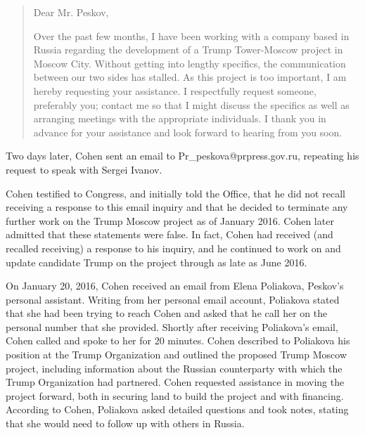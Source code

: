 \begin{quote}
Dear Mr. Peskov,

Over the past few months, I have been working with a company based in Russia regarding the development of a Trump Tower-Moscow project in Moscow City.
Without getting into lengthy specifics, the communication between our two sides has stalled.
As this project is too important, I am hereby requesting your assistance.
I respectfully request someone, preferably you; contact me so that I might discuss the specifics as well as arranging meetings with the appropriate individuals.
I thank you in advance for your assistance and look forward to hearing from you soon.%
\end{quote}

Two days later, Cohen sent an email to Pr_peskova@prpress.gov.ru, repeating his request to speak with Sergei Ivanov.%

Cohen testified to Congress, and initially told the Office, that he did not recall receiving a response to this email inquiry and that he decided to terminate any further work on the Trump Moscow project as of January 2016.
Cohen later admitted that these statements were false.
In fact, Cohen had received (and recalled receiving) a  response to his inquiry, and he continued to work on and update candidate Trump on the project through as late as June 2016.%

On January 20, 2016, Cohen received an email from Elena Poliakova, Peskov's personal assistant.
Writing from her personal email account, Poliakova stated that she had been trying to reach Cohen and asked that he call her on the personal number that she provided.%
Shortly after receiving Poliakova's email, Cohen called and spoke to her for 20 minutes.%
Cohen described to Poliakova his position at the Trump Organization and outlined the proposed Trump Moscow project, including information about the Russian counterparty with which the Trump Organization had partnered.
Cohen requested assistance in moving the project forward, both in securing land to build the project and with financing.
According to Cohen, Poliakova asked detailed questions and took notes, stating that she would need to follow up with others in Russia.%

